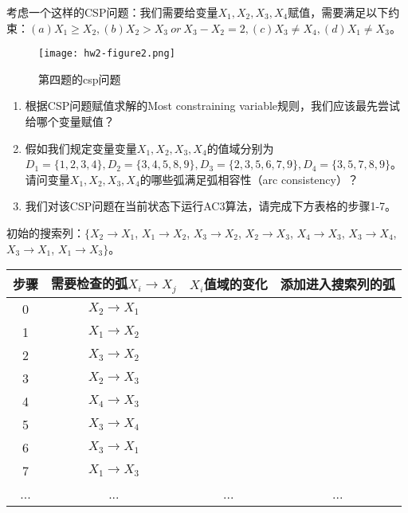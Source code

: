     \begin{problem}
        \indent 考虑一个这样的CSP问题：我们需要给变量\textit{$X_1, X_2, X_3, X_4$}赋值，需要满足以下约束：$(a)X_1\geq X_2, (b)X_2>X_3\ or\  X_3-X_2=2, (c)X_3\neq X_4, (d)X_1\neq X_3$。

\begin{figure}[H]
  \centering
  \texttt{[image: hw2-figure2.png]}
  \caption{第四题的csp问题}
  \label{hw2-figure2}
\end{figure}

\begin{enumerate}
    \item 根据CSP问题赋值求解的Most constraining variable规则，我们应该最先尝试给哪个变量赋值？
    \item 假如我们规定变量变量\textit{$X_1, X_2, X_3, X_4$}的值域分别为$D_1=\{1,2,3,4\}, D_2=\{3,4,5,8,9\}, D_3=\{2,3,5,6,7,9\}, D_4=\{3,5,7,8,9\}$。请问变量\textit{$X_1, X_2, X_3, X_4$}的哪些弧满足弧相容性（arc consistency）？
    \item 我们对该CSP问题在当前状态下运行AC3算法，请完成下方表格的步骤1-7。
\end{enumerate}

\begin{center}
初始的搜索列：$\{ X_2\rightarrow X_1$, $X_1\rightarrow X_2$, $X_3\rightarrow X_2$, $X_2\rightarrow X_3$, $X_4\rightarrow X_3$, $X_3\rightarrow X_4$, $X_3\rightarrow X_1$, $X_1\rightarrow X_3 \}$。\\
\begin{tabular}{|c|c|c|c|}
    \hline 
     步骤& 需要检查的弧$X_i\rightarrow X_j$ & $X_i$值域的变化 & 添加进入搜索列的弧   \\
     \hline 
     0 & $X_2\rightarrow X_1$ & &  \\ \hline
     1 & $X_1\rightarrow X_2$ &  & \\ \hline
     2 & $X_3\rightarrow X_2$ &   &   \\ \hline
     3 & $X_2\rightarrow X_3$ &   &  \\ \hline
     4 & $X_4\rightarrow X_3$ &   &  \\ \hline
     5 & $X_3\rightarrow X_4$ &   &  \\ \hline
     6 & $X_3\rightarrow X_1$ &   &  \\ \hline
     7 & $X_1\rightarrow X_3$ &   & \\ \hline
     ...& ... & ... & \qquad \qquad \qquad \quad ... \\ \hline
\end{tabular}\\
\end{center}
    \end{problem}

